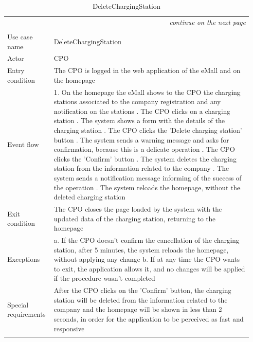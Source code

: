 \begin{center}
    \begin{longtable}{p{4cm} p{11cm}}
    \multicolumn{2}{r}{\itshape{continue on the next page}}\\
    \endfoot 
    \\
    \endlastfoot
    \hline
     Use case name &  DeleteChargingStation\\
     \hline
     Actor & CPO \\
     \hline
     Entry condition & The CPO is logged in the web application of the eMall and on the homepage \\
     \hline
     Event flow &   1. On the homepage the eMall shows to the CPO the charging stations associated to the company                   registration and any notification on the stations \newline
                    2. The CPO clicks on a charging station \newline 
                    3. The system shows a form with the details of the charging station \newline
                    4. The CPO clicks the 'Delete charging station' button \newline
                    5. The system sends a warning message and asks for confirmation, because this is a delicate operation \newline
                    6. The CPO clicks the 'Confirm' button \newline
                    7. The system deletes the charging station from the information related to the company \newline
                    8. The system sends a notification message informing of the success of the operation \newline
                    9. The system reloads the homepage, without the deleted charging station\\
     \hline
     Exit condition &  The CPO closes the page loaded by the system with the updated data of the charging station, returning to the homepage \\
     \hline
     Exceptions &   a. If the CPO doesn't confirm the cancellation of the charging station, after 5 minutes, the                    system reloads the homepage, without applying any change \newline
                    b. If at any time the CPO wants to exit, the application allows it, and no changes will be applied if the procedure wasn't completed \\
     \hline
     Special requirements & After the CPO clicks on the 'Confirm' button, the charging station will be deleted from the information related to the company and the homepage will be shown in less than 2 seconds, in order for the application to be perceived as fast and responsive \\
     \hline
    \caption{DeleteChargingStation}
    \label{tab:DeleteChargingStation}
    \end{longtable}
\end{center}

